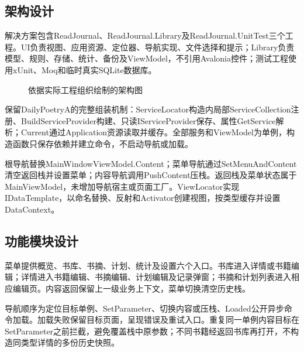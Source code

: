 \documentclass[UTF8,a4paper,11pt,fontset=none]{ctexart}
\begin{document}
\subsection{架构设计}
解决方案包含ReadJournal、ReadJournal.Library及ReadJournal.UnitTest三个工程。UI负责视图、应用资源、定位器、导航实现、文件选择和提示；Library负责模型、规则、存储、统计、备份及ViewModel，不引用Avalonia控件；测试工程使用xUnit、Moq和临时真实SQLite数据库。
\begin{figure}[H]\centering
{}\caption{依据实际工程组织绘制的架构图}\end{figure}

保留DailyPoetryA的完整组装机制：ServiceLocator构造内局部ServiceCollection注册、BuildServiceProvider构建、只读IServiceProvider保存、属性GetService解析；Current通过Application资源读取并缓存。全部服务和ViewModel为单例，构造函数只保存依赖并建立命令，不启动导航或加载。

根导航替换MainWindowViewModel.Content；菜单导航通过SetMenuAndContent清空返回栈并设置菜单；内容导航调用PushContent压栈。返回栈及菜单状态属于MainViewModel，未增加导航宿主或页面工厂。ViewLocator实现IDataTemplate，以命名替换、反射和Activator创建视图，按类型缓存并设置DataContext。
\subsection{功能模块设计}
菜单提供概览、书库、书摘、计划、统计及设置六个入口。书库进入详情或书籍编辑；详情进入书籍编辑、书摘编辑、计划编辑及记录弹窗；书摘和计划列表进入相应编辑页。内容返回保留上一级业务上下文，菜单切换清空历史栈。

导航顺序为定位目标单例、SetParameter、切换内容或压栈、Loaded公开异步命令加载。加载失败保留目标页面，呈现错误及重试入口。重复同一单例内容目标在SetParameter之前拦截，避免覆盖栈中原参数；不同书籍经返回书库再打开，不构造同类型详情的多份历史快照。
\end{document}
